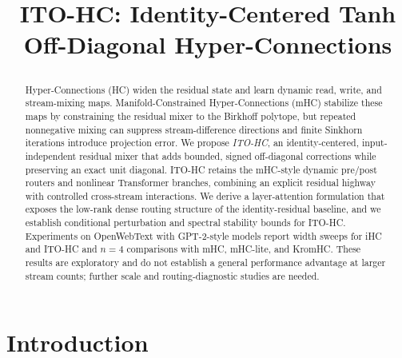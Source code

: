 \documentclass{article}
\title{\raggedright ITO-HC: Identity-Centered Tanh Off-Diagonal Hyper-Connections}
\author{}
\begin{document}
\maketitle

\begin{abstract}
Hyper-Connections (HC) widen the residual state and learn dynamic read, write, and stream-mixing maps. Manifold-Constrained Hyper-Connections (mHC) stabilize these maps by constraining the residual mixer to the Birkhoff polytope, but repeated nonnegative mixing can suppress stream-difference directions and finite Sinkhorn iterations introduce projection error. We propose \emph{ITO-HC}, an identity-centered, input-independent residual mixer that adds bounded, signed off-diagonal corrections while preserving an exact unit diagonal. ITO-HC retains the mHC-style dynamic pre/post routers and nonlinear Transformer branches, combining an explicit residual highway with controlled cross-stream interactions. We derive a layer-attention formulation that exposes the low-rank dense routing structure of the identity-residual baseline, and we establish conditional perturbation and spectral stability bounds for ITO-HC. Experiments on OpenWebText with GPT-2-style models report width sweeps for iHC and ITO-HC and $n=4$ comparisons with mHC, mHC-lite, and KromHC. These results are exploratory and do not establish a general performance advantage at larger stream counts; further scale and routing-diagnostic studies are needed.
\end{abstract}

\section{Introduction}
\end{document}
